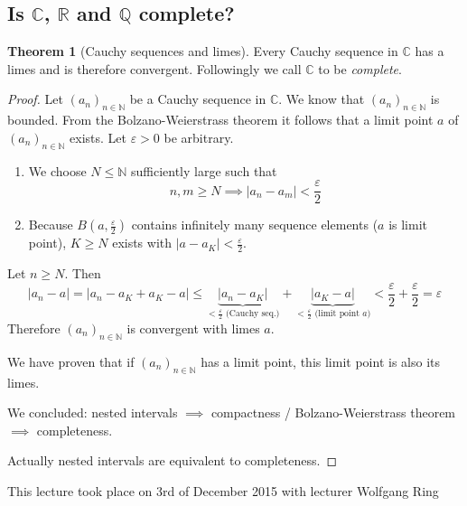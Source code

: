 \documentclass[a4paper,landscape,twocolumn]{article}
\theoremstyle{definition}
\newtheorem{theorem}{Theorem}
\newcommand\abs[1]{\left|#1\right|}
\newcommand\seq[1]{{\left(#1\right)}_{n \in \mathbb N}}
\newcommand\meta[3]{\begin{mdframed}[skipbelow=4pt,skipabove=4pt,innermargin=1pt,innerleftmargin=1pt,innerrightmargin=1pt]\begin{center}\small{\textdownarrow{} This #1 took place on #2 with lecturer #3}\end{center}\end{mdframed}}
\begin{document}
\subsection{Is $\mathbb C$, $\mathbb R$ and $\mathbb Q$ complete?}
%
\begin{theorem}[Cauchy sequences and limes]
  Every Cauchy sequence in $\mathbb C$ has a limes and is therefore convergent.
  Followingly we call $\mathbb C$ to be \emph{complete}.
\end{theorem}
\begin{proof}
  Let $\seq{a_n}$ be a Cauchy sequence in $\mathbb C$.
  We know that $\seq{a_n}$ is bounded.
  From the Bolzano-Weierstrass theorem it follows that a limit point $a$
  of $\seq{a_n}$ exists. Let $\varepsilon > 0$ be arbitrary.
  \begin{enumerate}
    \item We choose $N \leq \mathbb N$ sufficiently large such that
      \[ n,m \geq N \implies \abs{a_n - a_m} < \frac\varepsilon2 \]
    \item Because $B(a, \frac\varepsilon2)$ contains infinitely many sequence elements ($a$ is limit point),
      $K \geq N$ exists with $\abs{a - a_K} < \frac{\varepsilon}{2}$.
  \end{enumerate}
  Let $n \geq N$. Then
  \[
      \abs{a_n - a}
      = \abs{a_n - a_K + a_K - a} \leq \underbrace{\abs{a_n - a_K}}_{< \frac\varepsilon2 \text{ (Cauchy seq.)}} + \underbrace{\abs{a_K - a}}_{< \frac\varepsilon2 \text{ (limit point $a$)}}
      < \frac\varepsilon2 + \frac\varepsilon2 = \varepsilon
  \]
  Therefore $\seq{a_n}$ is convergent with limes $a$.

  We have proven that if $\seq{a_n}$ has a limit point, this limit point is also its limes.

  We concluded: nested intervals $\implies$ compactness / Bolzano-Weierstrass theorem $\implies$ completeness.

  Actually nested intervals are equivalent to completeness.
\end{proof}

\meta{lecture}{3rd of December 2015}{Wolfgang Ring}
\end{document}

